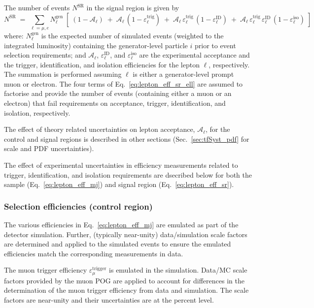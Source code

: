 The number of events $N^\textrm{SR}$ in the signal region is given by
\begin{equation}
  \label{eq:lepton_eff_sr}
  N^\textrm{SR} 
  \; = \; 
  \sum_{\ell = \mu,e} 
  N^\textrm{gen}_\ell 
  \; [ \;
  (1-\mathcal{A}_\ell)
  \; + \;
  \mathcal{A}_\ell \,
  (1-\varepsilon^\textrm{trig}_\ell)
  \; + \;
  \mathcal{A}_\ell \,
  \varepsilon^\textrm{trig}_\ell \,
  (1-\varepsilon^\textrm{ID}_\ell)
  \; + \;
  \mathcal{A}_\ell \,
  \varepsilon^\textrm{trig}_\ell \,
  \varepsilon^\textrm{ID}_\ell \,
  (1-\varepsilon^\textrm{iso}_\ell)
  \; ]
\end{equation}
where: $N^\textrm{gen}_\ell$ is the expected number of simulated
events (weighted to the integrated luminosity) containing the
generator-level particle $i$ prior to event selection requirements;
and $\mathcal{A}_\ell$, $\varepsilon^\textrm{ID}_\ell$, and
$\varepsilon^\textrm{iso}_\ell$ are the experimental acceptance and
the trigger, identification, and isolation efficiencies for the lepton
$\ell$, respectively. The summation is performed assuming $\ell$ is
either a generator-level prompt muon or electron. The four terms of
Eq.~\ref{eq:lepton_eff_sr_ell} are assumed to factorise and provide
the number of events (containing either a muon or an electron) that
fail requirements on acceptance, trigger, identification, and
isolation, respectively.

The effect of theory related uncertainties on lepton acceptance,
$\mathcal{A}_\ell$, for the \mj control and signal regions is
described in other sections (\eg Sec.~\ref{sec:tfSyst_pdf} for scale
and PDF uncertainties).

The effect of experimental uncertainties in efficiency measurements
related to trigger, identification, and isolation requirements are
dsecribed below for both the \mj sample (Eq.~\ref{eq:lepton_eff_mj})
and signal region (Eq.~\ref{eq:lepton_eff_sr}).

\subsubsection*{Selection efficiencies (\mj control region)}

The various efficiencies in Eq.~\ref{eq:lepton_eff_mj} are emulated as
part of the detector simulation. Further, (typically near-unity)
data/simulation scale factors are determined and applied to the
simulated events to ensure the emulated efficiencies match the
corresponding measurements in data.

The muon trigger efficiency $\varepsilon^\textrm{trigger}_\mu$ is
emulated in the simulation. Data/MC scale factors provided by the muon
POG are applied to account for differences in the determination of the
muon trigger efficiency from data and simulation. The scale factors
are near-unity and their uncertainties are at the percent level. 


